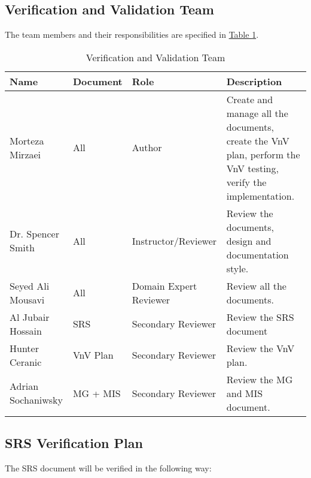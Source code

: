\documentclass[12pt, titlepage]{article}
\begin{document}
\subsection{Verification and Validation Team}

The team members and their responsibilities are specified in \hyperref[team]{Table \ref*{team}}.

\begin{table}[!h]
  \caption{Verification and Validation Team} \label{team}
  \vspace*{3mm}
  \begin{tabular}{|p{}|p{}|p{}|p{}|}
  \hline
  \textbf{Name} & \textbf{Document} & \textbf{Role} & \textbf{Description} \\
  \hline
  Morteza Mirzaei & All & Author & Create and manage all the documents, create the VnV plan, perform the VnV testing, verify the implementation. \\  
  \hline
  Dr. Spencer Smith & All & Instructor/Reviewer & Review the documents, design and documentation style. \\ 
  \hline
  Seyed Ali Mousavi & All & Domain Expert Reviewer & Review all the documents. \\  
  \hline
  Al Jubair Hossain & SRS & Secondary Reviewer & Review the SRS document \\
  \hline
  Hunter Ceranic & VnV Plan & Secondary Reviewer & Review the VnV plan. \\ 
  \hline 
  Adrian Sochaniwsky & MG + MIS & Secondary Reviewer & Review the MG and MIS document. \\
  \hline 
  \end{tabular}
\end{table}

\newpage


\subsection{SRS Verification Plan}

The SRS document will be verified in the following way:
\end{document}
